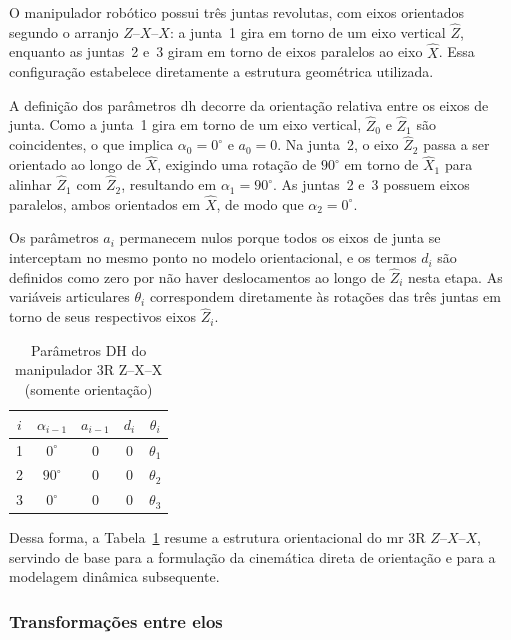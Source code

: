 O manipulador robótico possui três juntas revolutas, com eixos orientados segundo o arranjo $Z$--$X$--$X$: a junta~1 gira em torno de um eixo vertical $\hat{Z}$, enquanto as juntas~2 e~3 giram em torno de eixos paralelos ao eixo $\hat{X}$. Essa configuração estabelece diretamente a estrutura geométrica utilizada.

A definição dos parâmetros \gls{dh} decorre da orientação relativa entre os eixos de junta. Como a junta~1 gira em torno de um eixo vertical, $\hat{Z}_0$ e $\hat{Z}_1$ são coincidentes, o que implica $\alpha_0 = 0^\circ$ e $a_0 = 0$. Na junta~2, o eixo $\hat{Z}_2$ passa a ser orientado ao longo de $\hat{X}$, exigindo uma rotação de $90^\circ$ em torno de $\hat{X}_1$ para alinhar $\hat{Z}_1$ com $\hat{Z}_2$, resultando em $\alpha_1 = 90^\circ$. As juntas~2 e~3 possuem eixos paralelos, ambos orientados em $\hat{X}$, de modo que $\alpha_2 = 0^\circ$.

Os parâmetros $a_i$ permanecem nulos porque todos os eixos de junta se interceptam no mesmo ponto no modelo orientacional, e os termos $d_i$ são definidos como zero por não haver deslocamentos ao longo de $\hat{Z}_i$ nesta etapa. As variáveis articulares $\theta_i$ correspondem diretamente às rotações das três juntas em torno de seus respectivos eixos $\hat{Z}_i$.

\begin{table}[ht]
\centering
\caption{Parâmetros DH do manipulador 3R Z--X--X (somente orientação)}
\label{tab:dh_zxx}
\begin{tabular}{c|c|c|c|c}
$i$ & $\alpha_{i-1}$ & $a_{i-1}$ & $d_i$ & $\theta_i$ \\
\hline
1 & $0^\circ$  & 0 & 0 & $\theta_1$ \\
2 & $90^\circ$ & 0 & 0 & $\theta_2$ \\
3 & $0^\circ$  & 0 & 0 & $\theta_3$ \\
\end{tabular}
\end{table}

Dessa forma, a Tabela~\ref{tab:dh_zxx} resume a estrutura orientacional do \gls{mr} 3R $Z$--$X$--$X$, servindo de base para a formulação da cinemática direta de orientação e para a modelagem dinâmica subsequente.

\subsubsection{Transformações entre elos}
\label{sec:transformacoes_elos}

